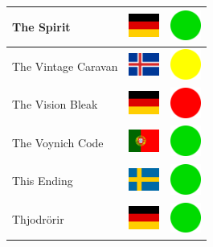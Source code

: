 \documentclass[12pt, a4paper, twoside]{report}
\begin{document}
\begin{center}
\begin{longtable}{|p{5cm}|p{2cm}|p{2cm}|}
 The Spirit                                                 & \includegraphics[width=1cm]{../4x3/de} &   \includegraphics[width=1cm]{../likes/y} \\ \hline
 The Vintage Caravan                                        & \includegraphics[width=1cm]{../4x3/is} &   \includegraphics[width=1cm]{../likes/m} \\ \hline
 The Vision Bleak                                           & \includegraphics[width=1cm]{../4x3/de} &   \includegraphics[width=1cm]{../likes/n} \\ \hline
 The Voynich Code                                           & \includegraphics[width=1cm]{../4x3/pt} &   \includegraphics[width=1cm]{../likes/y} \\ \hline
 This Ending                                                & \includegraphics[width=1cm]{../4x3/se} &   \includegraphics[width=1cm]{../likes/y} \\ \hline
 Thjodrörir                                                 & \includegraphics[width=1cm]{../4x3/de} &   \includegraphics[width=1cm]{../likes/y} \\ \hline

\end{longtable}
\end{center}
\end{document}
